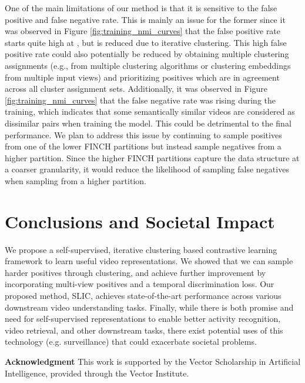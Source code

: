 \documentclass[10pt,twocolumn,letterpaper]{article}
\begin{document}
One of the main limitations of our method is that it is sensitive to the false positive and false negative rate. This is mainly an issue for the former since it was observed in Figure \ref{fig:training_nmi_curves} that the false positive rate starts quite high at , but is reduced due to iterative clustering. This high false positive rate could also potentially be reduced by obtaining multiple clustering assignments (e.g., from multiple clustering algorithms or clustering embeddings from multiple input views) and prioritizing positives which are in agreement across all cluster assignment sets. 
Additionally, it was observed in Figure \ref{fig:training_nmi_curves} that the false negative rate was rising during the training, which indicates that some semantically similar videos are considered as dissimilar pairs when training the model. This could be detrimental to the final performance. We plan to address this issue by continuing to sample positives from one of the lower FINCH partitions but instead sample negatives from a higher partition. Since the higher FINCH partitions capture the data structure at a coarser granularity, it would reduce the likelihood of sampling false negatives when sampling from a higher partition. 




\vspace{-0.2cm}

\section{Conclusions and Societal Impact}
\vspace{-0.2cm}
\label{conclusion}
We propose a self-supervised, iterative clustering based contrastive learning framework to learn useful video representations. We showed that we can sample harder positives through clustering, and achieve further improvement by incorporating multi-view positives and a temporal discrimination loss. Our proposed method, SLIC, achieves state-of-the-art performance across various downstream video understanding tasks. Finally, while there is both promise and need for self-supervised representations to enable better activity recognition, video retrieval, and other downstream tasks, there exist potential uses of this technology (e.g. surveillance) that could exacerbate societal problems.     

\noindent \textbf{Acknowledgment} This work is supported by the Vector Scholarship in Artificial Intelligence, provided through the Vector Institute.
\end{document}
